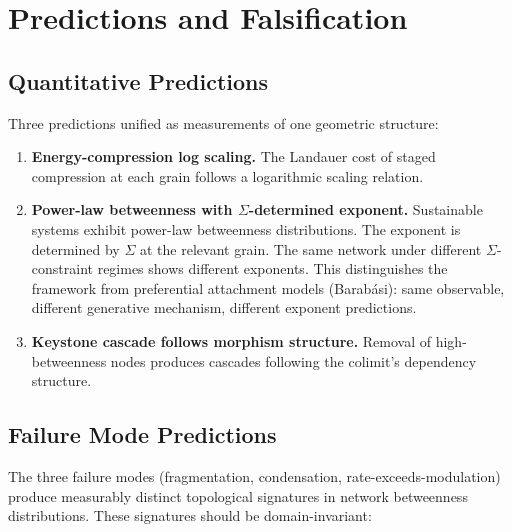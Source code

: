 \documentclass[12pt,a4paper]{article}
\begin{document}
\section{Predictions and Falsification}
\label{sec:predictions}

\subsection{Quantitative Predictions}
\label{sec:quantitative-predictions}

Three predictions unified as measurements of one geometric structure:

\begin{enumerate}
  \item \textbf{Energy-compression log scaling.} The Landauer cost of staged compression at each grain follows a logarithmic scaling relation.

  \item \textbf{Power-law betweenness with $\Sigma$-determined exponent.} Sustainable systems exhibit power-law betweenness distributions. The exponent is determined by $\Sigma$ at the relevant grain. The same network under different $\Sigma$-constraint regimes shows different exponents. This distinguishes the framework from preferential attachment models (Barab\'asi): same observable, different generative mechanism, different exponent predictions.

  \item \textbf{Keystone cascade follows morphism structure.} Removal of high-betweenness nodes produces cascades following the colimit's dependency structure.
\end{enumerate}

\subsection{Failure Mode Predictions}
\label{sec:failure-predictions}

The three failure modes (fragmentation, condensation, rate-exceeds-modulation) produce measurably distinct topological signatures in network betweenness distributions. These signatures should be domain-invariant:
\end{document}
